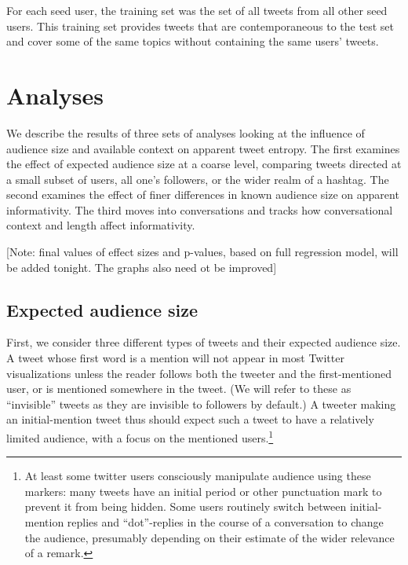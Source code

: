 \documentclass[11pt,letterpaper]{article}
\begin{document}
For each seed user, the training set was the set of all tweets from all other seed users.  This training set provides tweets that are contemporaneous to the test set and cover some of the same topics without containing the same users' tweets.

\section{Analyses}

We describe the results of three sets of analyses looking at the influence of audience size and available context on apparent tweet entropy. The first examines the effect of expected audience size at a coarse level, comparing tweets directed at a small subset of users, all one's followers, or the wider realm of a hashtag.   The second examines the effect of finer differences in known audience size on apparent informativity.  The third moves into conversations and tracks how conversational context and length affect informativity.

[Note: final values of effect sizes and p-values, based on full regression model, will be added tonight. The graphs also need ot be improved]

\subsection{Expected audience size}

First, we consider three different types of tweets and their expected audience size.  A tweet whose first word is a mention will not appear in most Twitter visualizations unless the reader follows both the tweeter and the first-mentioned user, or is mentioned somewhere in the tweet. (We will refer to these as ``invisible'' tweets as they are invisible to followers by default.)  A tweeter making an initial-mention tweet thus should expect such a tweet to have a relatively limited audience, with a focus on the mentioned users.\footnote{At least some twitter users consciously manipulate audience using these markers: many tweets have an initial period or other punctuation mark to prevent it from being hidden. Some users routinely switch between initial-mention replies and ``dot''-replies in the course of a conversation to change the audience, presumably depending on their estimate of the wider relevance of a remark.}
\end{document}
